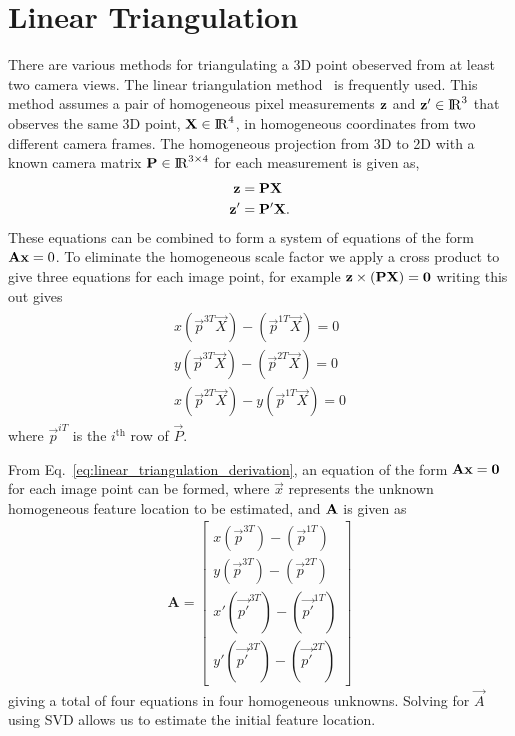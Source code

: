 \section{Linear Triangulation}
\label{subsec:linear_triangulation}

There are various methods for triangulating a 3D point obeserved from at least
two camera views. The linear triangulation method~\cite{Hartley2003} is
frequently used. This method assumes a pair of homogeneous pixel measurements
${{\mathbf{z}}}$ and ${{\mathbf{z}}}' \in {\rm I\!R}^{3}$ that observes the same 3D
point, ${\mathbf{X}} \in {\rm I\!R}^{4}$, in homogeneous coordinates from two different
camera frames. The homogeneous projection from 3D to 2D with a known camera
matrix ${\mathbf{P}} \in {\rm I\!R}^{3 \times 4}$ for each measurement is given as,
%
\begin{align}
\begin{split}
	{{\mathbf{z}}} &= \mathbf{P} \mathbf{X} \\
	{{\mathbf{z}}}' &= \mathbf{P}' \mathbf{X}.
\end{split}
\end{align}
%
These equations can be combined to form a system of equations of the form
${\mathbf{A}} {\mathbf{x}} = 0$. To eliminate the homogeneous scale factor we apply a
cross product to give three equations for each image point, for example
${{\mathbf{z}}} \times ({\mathbf{P}} {\mathbf{X}}) = {\mathbf{0}}$ writing this out gives
%
\begin{align}
\label{eq:linear_triangulation_derivation}
\begin{split}
  x (\Vec{p}^{3T} \Vec{X}) - (\Vec{p}^{1T} \Vec{X}) = 0 \\
  y (\Vec{p}^{3T} \Vec{X}) - (\Vec{p}^{2T} \Vec{X}) = 0 \\
  x (\Vec{p}^{2T} \Vec{X}) - y (\Vec{p}^{1T} \Vec{X}) = 0
\end{split}
\end{align}
%
where $\Vec{p}^{iT}$ is the $i^{\mbox{th}}$ row of $\Vec{P}$.

From Eq.~\eqref{eq:linear_triangulation_derivation}, an equation of the form
${\mathbf{A}} {\mathbf{x}} = {\mathbf{0}}$ for each image point can be formed, where
$\Vec{x}$ represents the unknown homogeneous feature location to be
estimated, and ${\mathbf{A}}$ is given as
%
\begin{align}
  \mathbf{A} =
  \begin{bmatrix}
    x (\Vec{p}^{3T}) - (\Vec{p}^{1T}) \\
    y (\Vec{p}^{3T}) - (\Vec{p}^{2T}) \\
    x' (\Vec{p'}^{3T}) - (\Vec{p'}^{1T}) \\
    y' (\Vec{p'}^{3T}) - (\Vec{p'}^{2T})
  \end{bmatrix}
  \label{eq:linear_triangulation_ derivation}
\end{align}
%
giving a total of four equations in four homogeneous unknowns. Solving for
$\Vec{A}$ using SVD allows us to estimate the initial feature location.

